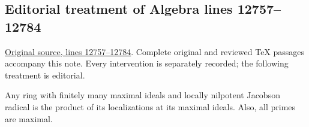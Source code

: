 \subsection{Editorial treatment of Algebra lines 12757--12784}

\hypertarget{algebra-context-169}{}

\noindent\href{https://github.com/stacks/stacks-project/blob/a04446e57ec1fbc252a871afcec7752fb2807b14/algebra.tex\#L12757}{Original source, lines 12757--12784}. Complete original and reviewed TeX passages accompany this note. Every intervention is separately recorded; the following treatment is editorial.


\begin{lemma}
\label{editorial-source-lemma-product-local}
Any ring with finitely many maximal ideals and
locally nilpotent Jacobson radical is the product of its localizations
at its maximal ideals. Also, all primes are maximal.
\end{lemma}


